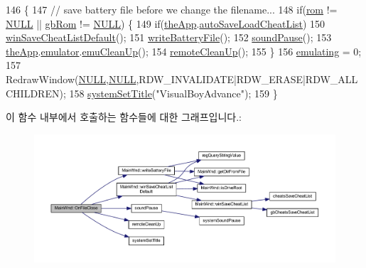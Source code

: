 \begin{DoxyCode}
146 \{
147   \textcolor{comment}{// save battery file before we change the filename...}
148   \textcolor{keywordflow}{if}(\mbox{\hyperlink{_globals_8cpp_adafc6ed627110c42f3893c9783f55320}{rom}} != \mbox{\hyperlink{getopt1_8c_a070d2ce7b6bb7e5c05602aa8c308d0c4}{NULL}} || \mbox{\hyperlink{gb_globals_8cpp_ae4f6bd8162474dbcfdbc54c36d7f5695}{gbRom}} != \mbox{\hyperlink{getopt1_8c_a070d2ce7b6bb7e5c05602aa8c308d0c4}{NULL}}) \{
149     \textcolor{keywordflow}{if}(\mbox{\hyperlink{_v_b_a_8cpp_a8095a9d06b37a7efe3723f3218ad8fb3}{theApp}}.\mbox{\hyperlink{class_v_b_a_a234d3693fb47b5ca956545eb7f9671fb}{autoSaveLoadCheatList}})
150       \mbox{\hyperlink{class_main_wnd_afd3b77fc621f2b464369c472262689ab}{winSaveCheatListDefault}}();
151     \mbox{\hyperlink{class_main_wnd_a653d11c15657ad15c35073eaf892519c}{writeBatteryFile}}();
152     \mbox{\hyperlink{_sound_8cpp_a0716e7957671de324eeaa4ac1729d6b7}{soundPause}}();
153     \mbox{\hyperlink{_v_b_a_8cpp_a8095a9d06b37a7efe3723f3218ad8fb3}{theApp}}.\mbox{\hyperlink{class_v_b_a_ab40fc008c6714c3c8670eb8a9085a4a1}{emulator}}.\mbox{\hyperlink{struct_emulated_system_ad85b1185af3fdc35c666eb4d0eb1a431}{emuCleanUp}}();
154     \mbox{\hyperlink{_main_wnd_file_8cpp_ad472decd8f1a11c276d8bfb3740bd8ec}{remoteCleanUp}}();
155   \}
156   \mbox{\hyperlink{_main_wnd_file_8cpp_af9cc36078b1b311753963297ae7f2a74}{emulating}} = 0;
157   RedrawWindow(\mbox{\hyperlink{getopt1_8c_a070d2ce7b6bb7e5c05602aa8c308d0c4}{NULL}},\mbox{\hyperlink{getopt1_8c_a070d2ce7b6bb7e5c05602aa8c308d0c4}{NULL}},RDW\_INVALIDATE|RDW\_ERASE|RDW\_ALLCHILDREN);
158   \mbox{\hyperlink{system_8cpp_a154a393a2a25c1681855dc5fe4545b68}{systemSetTitle}}(\textcolor{stringliteral}{"VisualBoyAdvance"});
159 \}
\end{DoxyCode}
이 함수 내부에서 호출하는 함수들에 대한 그래프입니다.\+:
\nopagebreak
\begin{figure}[H]
\begin{center}
\leavevmode
\includegraphics[width=350pt]{class_main_wnd_abf162c1763ea3246bdac171847fb2d9d_cgraph}
\end{center}
\end{figure}
